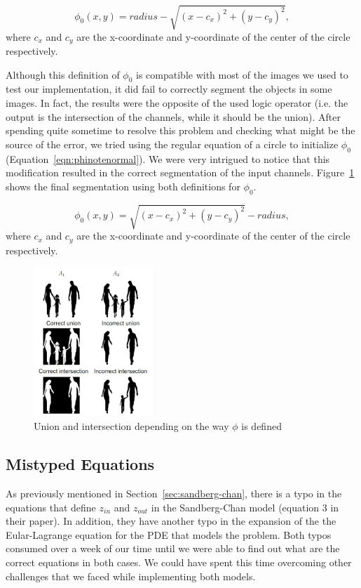 \documentclass[10pt,twocolumn,letterpaper]{article}
\begin{document}
\begin{equation}
\label{eqn:phinote}
\phi_{0} (x, y) = radius - \sqrt{ (x - c_x)^2 + (y - c_y)^2 },
\end{equation}
where $c_x$ and $c_y$ are the x-coordinate and y-coordinate of the center of the circle respectively.

Although this definition of $\phi_0$ is compatible with most of the images we used to test our implementation, it did fail to correctly segment the objects in
some images. In fact, the results were the opposite of the used logic operator (i.e. the output is the intersection of the channels, while it should be the
union). After spending quite sometime to resolve this problem and checking what might be the source of the error, we tried using the regular equation of a
circle to initialize $\phi_0$ (Equation~\ref{eqn:phinotenormal}). We were very intrigued to notice that this modification resulted in the correct segmentation
of the input channels. Figure~\ref{fig:phidef} shows the final segmentation using both definitions for $\phi_0$.

\begin{equation}
\label{eqn:phinotenormal}
\phi_{0} (x, y) = \sqrt{ (x - c_x)^2 + (y - c_y)^2 } - radius,
\end{equation}
where $c_x$ and $c_y$ are the x-coordinate and y-coordinate of the center of the circle respectively.

\begin{figure}[t]
\centering
\includegraphics[width=0.4\textwidth]{phidef.png}
\caption{Union and intersection depending on the way $\phi$ is defined}
\label{fig:phidef}
\end{figure}

\subsection{Mistyped Equations}
As previously mentioned in Section~\ref{sec:sandberg-chan}, there is a typo in the equations that define $z_{in}$ and $z_{out}$ in the Sandberg-Chan model
(equation 3 in their paper). In addition, they have another typo in the expansion of the the Eular-Lagrange equation for the PDE that models the problem. Both
typos consumed over a week of our time until we were able to find out what are the correct equations in both cases. We could have spent this time overcoming
other challenges that we faced while implementing both models.
\end{document}
